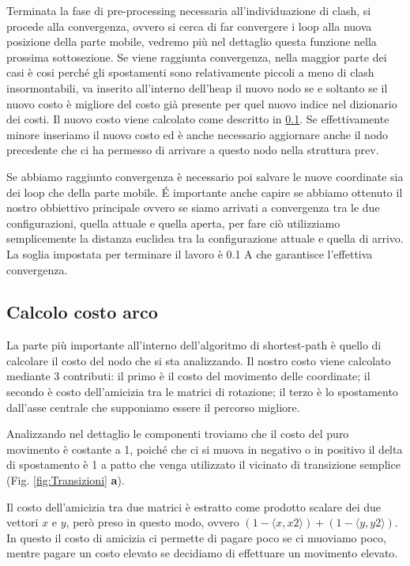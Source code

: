 Terminata la fase di pre-processing necessaria all'individuazione di clash, si procede alla convergenza, ovvero si cerca di far convergere i loop alla nuova posizione della parte mobile, vedremo più nel dettaglio questa funzione nella prossima sottosezione. Se viene raggiunta convergenza, nella maggior parte dei casi è cosi perché gli spostamenti sono relativamente piccoli a meno di clash insormontabili, va inserito all'interno dell'heap il nuovo nodo se e soltanto se il nuovo costo è migliore del costo già presente per quel nuovo indice nel dizionario dei costi. Il nuovo costo viene calcolato come descritto in \ref{subsec:calcolocostoarco}. Se effettivamente minore inseriamo il nuovo costo ed è anche necessario aggiornare anche il nodo precedente che ci ha permesso di arrivare a questo nodo nella struttura prev. 

Se abbiamo raggiunto convergenza è necessario poi salvare le nuove coordinate sia dei loop che della parte mobile. É importante anche capire se abbiamo ottenuto il nostro obbiettivo principale ovvero se siamo arrivati a convergenza tra le due configurazioni, quella attuale e quella aperta, per fare ciò utilizziamo semplicemente la distanza euclidea tra la configurazione attuale e quella di arrivo. La soglia impostata per terminare il lavoro è 0.1 A che garantisce l'effettiva convergenza. 

\subsection{Calcolo costo arco}\label{subsec:calcolocostoarco}
La parte più importante all'interno dell'algoritmo di shortest-path è quello di calcolare il costo del nodo che si sta analizzando. Il nostro costo viene calcolato mediante 3 contributi: il primo è il costo del movimento delle coordinate; il secondo è costo dell'amicizia tra le matrici di rotazione; il terzo è lo spostamento dall'asse centrale che supponiamo essere il percorso migliore.

Analizzando nel dettaglio le componenti troviamo che il costo del puro movimento è costante a 1, poiché che ci si muova in negativo o in positivo il delta di spostamento è 1 a patto che venga utilizzato il vicinato di transizione semplice (Fig. \ref{fig:Transizioni} \textbf{a}). 

Il costo dell'amicizia tra due matrici è estratto come prodotto scalare dei due vettori $x$ e $y$, però preso in questo modo, ovvero $(1-\langle x, x2\rangle) + (1-\langle y, y2\rangle)$. In questo il costo di amicizia ci permette di pagare poco se ci muoviamo poco, mentre pagare un costo elevato se decidiamo di effettuare un movimento elevato. 

